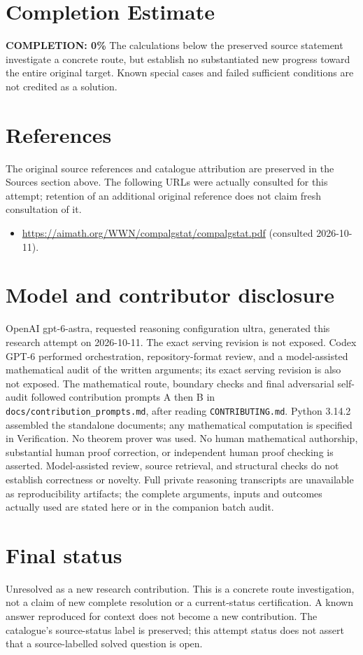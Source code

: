\documentclass[11pt]{article}
\begin{document}
\section{Completion Estimate}
\noindent\textbf{COMPLETION: 0\%}
The calculations below the preserved source statement investigate a concrete route,
but establish no substantiated new progress toward the entire original target.
Known special cases and failed sufficient conditions are not credited as a solution.
\section{References}
The original source references and catalogue attribution are preserved in the
Sources section above. The following URLs were actually consulted for this attempt;
retention of an additional original reference does not claim fresh consultation of it.
\begin{itemize}
\item \url{https://aimath.org/WWN/compalgstat/compalgstat.pdf} (consulted 2026-10-11). 
\end{itemize}
\section{Model and contributor disclosure}
OpenAI gpt-6-astra, requested reasoning configuration ultra, generated this research
attempt on 2026-10-11. The exact serving revision is not exposed. Codex GPT-6
performed orchestration, repository-format review, and a model-assisted mathematical
audit of the written arguments; its exact serving revision
is also not exposed. The mathematical route, boundary checks and final adversarial
self-audit followed contribution prompts A then B in
\texttt{docs/contribution\_prompts.md}, after reading \texttt{CONTRIBUTING.md}.
Python 3.14.2 assembled the standalone documents; any mathematical computation is
specified in Verification. No theorem prover was used. No human mathematical
authorship, substantial human proof correction, or independent human proof checking
is asserted. Model-assisted review, source retrieval, and structural checks do not
establish correctness or novelty. Full private reasoning transcripts are unavailable
as reproducibility artifacts; the complete arguments, inputs and outcomes actually
used are stated here or in the companion batch audit.
\section{Final status}
Unresolved as a new research contribution. This is a concrete route investigation,
not a claim of new complete resolution or a current-status certification. A known
answer reproduced for context does not become a new contribution. The catalogue's
source-status label is preserved; this attempt status does not assert that a
source-labelled solved question is open.
\end{document}
